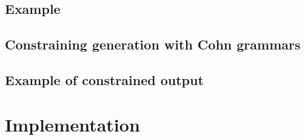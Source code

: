 \subsection{Example}

\subsection{Constraining generation with Cohn grammars}

\subsection{Example of constrained output}

\section{Implementation}


